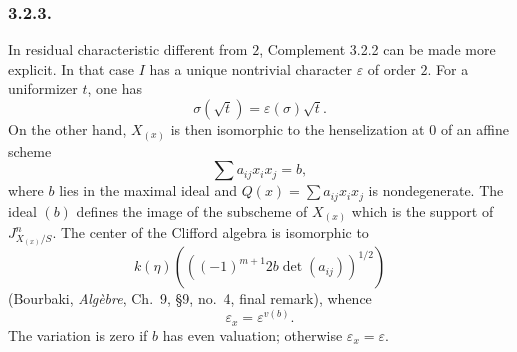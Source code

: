 \subsubsection*{3.2.3.}
In residual characteristic different from $2$, Complement 3.2.2 can
be made more explicit.  In that case $I$ has a unique nontrivial
character $\varepsilon$ of order $2$.  For a uniformizer $t$, one
has
\[
\sigma(\sqrt t)=\varepsilon(\sigma)\sqrt t.
\]
On the other hand, $X_{(x)}$ is then isomorphic to the henselization
at $0$ of an affine scheme
\[
\sum a_{ij}x_ix_j=b,
\]
where $b$ lies in the maximal ideal and
$Q(x)=\sum a_{ij}x_ix_j$ is nondegenerate.  The ideal $(b)$ defines
the image of the subscheme of $X_{(x)}$ which is the support of
$J^n_{X_{(x)}/S}$.  The center of the Clifford algebra is isomorphic
to
\[
k(\eta)\left(\left((-1)^{m+1}2b\det(a_{ij})\right)^{1/2}\right)
\]
(Bourbaki, \emph{Alg\`ebre}, Ch.~9, \S9, no.~4, final remark), whence
\[
\varepsilon_x=\varepsilon^{v(b)}.
\]
The variation is zero if $b$ has even valuation; otherwise
$\varepsilon_x=\varepsilon$.
